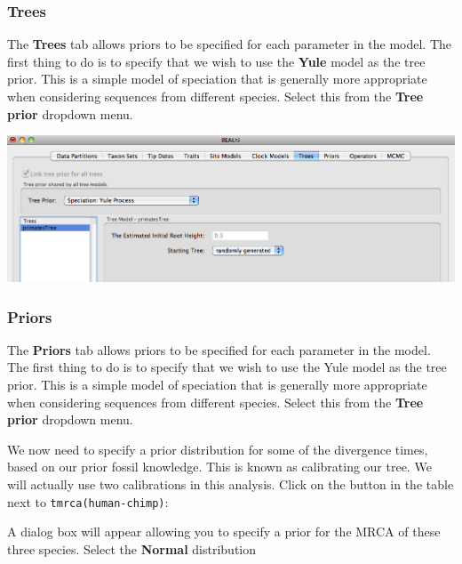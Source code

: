 \documentclass[12pt]{article}
\begin{document}
\subsubsection*{Trees }

The {\bf Trees} tab allows priors to be specified for each parameter in the
model. The first thing to do is to specify that we wish to use the \textbf{Yule} model 
as the tree prior. This is a simple model of speciation that
is generally more appropriate when considering sequences from different species.
Select this from the {\bf Tree prior} dropdown menu.

\medskip{}

\includegraphics[scale=0.4]{figures/BEAUti_Tree}

\medskip{}

\subsubsection*{Priors }

The {\bf Priors} tab allows priors to be specified for each parameter in the
model. The first thing to do is to specify that we wish to use the Yule model 
as the tree prior. This is a simple model of speciation that
is generally more appropriate when considering sequences from different species.
Select this from the {\bf Tree prior} dropdown menu.

We now need to specify a prior distribution for some of the divergence times, based on our prior fossil knowledge. This is known
as calibrating our tree. We will actually use two calibrations
in this analysis. Click on the button in the table next to \texttt{tmrca(human-chimp)}: 

A dialog box will appear allowing you to specify a prior for the
MRCA of these three species. Select the \textbf{Normal} distribution

\medskip{}
\end{document}
